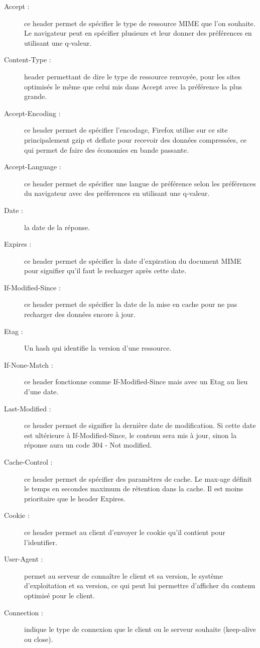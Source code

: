 \documentclass[conference]{IEEEtran}
\begin{document}
\begin{description}
 \item[Accept : ] ce header permet de spécifier le type de ressource MIME que l'on souhaite. Le navigateur peut en spécifier plusieurs et leur donner des préférences en utilisant une q-valeur.
 \item[Content-Type : ] header permettant de dire le type de ressource renvoyée, pour les sites optimisés le même que celui mis dans Accept avec la préférence la plus grande.
 \item[Accept-Encoding : ] ce header permet de spécifier l'encodage, Firefox utilise sur ce site principalement gzip et deflate pour recevoir des données compressées, ce qui permet de faire des économies en bande passante.
 \item[Accept-Language : ] ce header permet de spécifier une langue de préférence selon les préférences du navigateur avec des préferences en utilisant une q-valeur.
 \item[Date : ] la date de la réponse.
 \item[Expires : ] ce header permet de spécifier la date d'expiration du document MIME pour signifier qu'il faut le recharger après cette date.
 \item[If-Modified-Since : ] ce header permet de spécifier la date de la mise en cache pour ne pas recharger des données encore à jour.
 \item[Etag : ] Un hash qui identifie la version d'une ressource.
 \item[If-None-Match : ] ce header fonctionne comme If-Modified-Since mais avec un Etag au lieu d'une date.
 \item[Last-Modified : ] ce header permet de signifier la dernière date de modification. Si cette date est ultérieure à If-Modified-Since, le contenu sera mis à jour, sinon la réponse aura un code 304 - Not modified.
 \item[Cache-Control : ] ce header permet de spécifier des paramètres de cache. Le max-age définit le temps en secondes maximum de rétention dans la cache. Il est moins prioritaire que le header Expires.
 \item[Cookie : ] ce header permet au client d'envoyer le cookie qu'il contient pour l'identifier.
 \item[User-Agent : ] permet au serveur de connaître le client et sa version, le système d'exploitation et sa version, ce qui peut lui permettre d'afficher du contenu optimisé pour le client.
 \item[Connection : ] indique le type de connexion que le client ou le serveur souhaite (keep-alive ou close).

\end{description}
\end{document}
